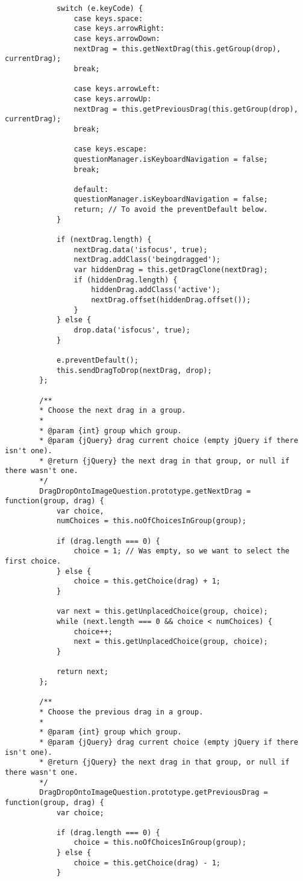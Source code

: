 \begin{lstlisting}
			switch (e.keyCode) {
				case keys.space:
				case keys.arrowRight:
				case keys.arrowDown:
				nextDrag = this.getNextDrag(this.getGroup(drop), currentDrag);
				break;
				
				case keys.arrowLeft:
				case keys.arrowUp:
				nextDrag = this.getPreviousDrag(this.getGroup(drop), currentDrag);
				break;
				
				case keys.escape:
				questionManager.isKeyboardNavigation = false;
				break;
				
				default:
				questionManager.isKeyboardNavigation = false;
				return; // To avoid the preventDefault below.
			}
			
			if (nextDrag.length) {
				nextDrag.data('isfocus', true);
				nextDrag.addClass('beingdragged');
				var hiddenDrag = this.getDragClone(nextDrag);
				if (hiddenDrag.length) {
					hiddenDrag.addClass('active');
					nextDrag.offset(hiddenDrag.offset());
				}
			} else {
				drop.data('isfocus', true);
			}
			
			e.preventDefault();
			this.sendDragToDrop(nextDrag, drop);
		};
		
		/**
		* Choose the next drag in a group.
		*
		* @param {int} group which group.
		* @param {jQuery} drag current choice (empty jQuery if there isn't one).
		* @return {jQuery} the next drag in that group, or null if there wasn't one.
		*/
		DragDropOntoImageQuestion.prototype.getNextDrag = function(group, drag) {
			var choice,
			numChoices = this.noOfChoicesInGroup(group);
			
			if (drag.length === 0) {
				choice = 1; // Was empty, so we want to select the first choice.
			} else {
				choice = this.getChoice(drag) + 1;
			}
			
			var next = this.getUnplacedChoice(group, choice);
			while (next.length === 0 && choice < numChoices) {
				choice++;
				next = this.getUnplacedChoice(group, choice);
			}
			
			return next;
		};
		
		/**
		* Choose the previous drag in a group.
		*
		* @param {int} group which group.
		* @param {jQuery} drag current choice (empty jQuery if there isn't one).
		* @return {jQuery} the next drag in that group, or null if there wasn't one.
		*/
		DragDropOntoImageQuestion.prototype.getPreviousDrag = function(group, drag) {
			var choice;
			
			if (drag.length === 0) {
				choice = this.noOfChoicesInGroup(group);
			} else {
				choice = this.getChoice(drag) - 1;
			}
			

\end{lstlisting}
